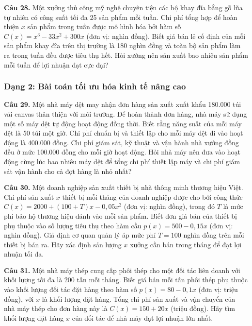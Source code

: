 \documentclass[12pt]{article}
\begin{document}
	\vspace{0.6cm}
	\noindent \textbf{Câu 28.} Một xưởng thủ công mỹ nghệ chuyên tiện các bộ khay đĩa bằng gỗ lũa tự nhiên có công suất tối đa 25 sản phẩm mỗi tuần. Chi phí tổng hợp để hoàn thiện $x$ sản phẩm trong tuần được mô hình hóa bởi hàm số $C(x) = x^3 - 33x^2 + 300x$ (đơn vị: nghìn đồng). Biết giá bán lẻ cố định của mỗi sản phẩm khay đĩa trên thị trường là 180 nghìn đồng và toàn bộ sản phẩm làm ra trong tuần đều được tiêu thụ hết. Hỏi xưởng nên sản xuất bao nhiêu sản phẩm mỗi tuần để lợi nhuận đạt cực đại?
	
	\subsubsection{Dạng 2: Bài toán tối ưu hóa kinh tế nâng cao}
	
	\noindent \textbf{Câu 29.} Một nhà máy dệt may nhận đơn hàng sản xuất xuất khẩu 180.000 túi vải canvas thân thiện với môi trường. Để hoàn thành đơn hàng, nhà máy sử dụng một số máy dệt tự động hoạt động đồng thời. Biết rằng năng suất của mỗi máy dệt là 50 túi một giờ. Chi phí chuẩn bị và thiết lập cho mỗi máy dệt đi vào hoạt động là 400.000 đồng. Chi phí giám sát, kỹ thuật và vận hành nhà xưởng đồng đều ở mức 100.000 đồng cho mỗi giờ hoạt động. Hỏi nhà máy nên đưa vào hoạt động cùng lúc bao nhiêu máy dệt để tổng chi phí thiết lập máy và chi phí giám sát vận hành cho cả đợt hàng là nhỏ nhất?
	
	\vspace{0.6cm}
	\noindent \textbf{Câu 30.} Một doanh nghiệp sản xuất thiết bị nhà thông minh thương hiệu Việt. Chi phí sản xuất $x$ thiết bị mỗi tháng của doanh nghiệp được cho bởi công thức $C(x) = 2000 + (100 + T)x - 0,05x^2$ (đơn vị: nghìn đồng), trong đó $T$ là mức phí bảo hộ thương hiệu đánh vào mỗi sản phẩm. Biết đơn giá bán của thiết bị phụ thuộc vào số lượng tiêu thụ theo hàm cầu $p(x) = 500 - 0,15x$ (đơn vị: nghìn đồng). Giả định cơ quan quản lý áp mức phí $T = 100$ nghìn đồng trên mỗi thiết bị bán ra. Hãy xác định sản lượng $x$ xưởng cần bán trong tháng để đạt lợi nhuận tối đa.
	
	\vspace{0.6cm}
	\noindent \textbf{Câu 31.} Một nhà máy thép cung cấp phôi thép cho một đối tác liên doanh với khối lượng tối đa là 200 tấn mỗi tháng. Biết giá bán mỗi tấn phôi thép phụ thuộc vào khối lượng đối tác đặt hàng theo hàm số $p(x) = 80 - 0,1x$ (đơn vị: triệu đồng), với $x$ là khối lượng đặt hàng. Tổng chi phí sản xuất và vận chuyển của nhà máy thép cho đơn hàng này là $C(x) = 150 + 20x$ (triệu đồng). Hãy tìm khối lượng đặt hàng $x$ của đối tác để nhà máy đạt lợi nhuận lớn nhất.
	
\end{document}
